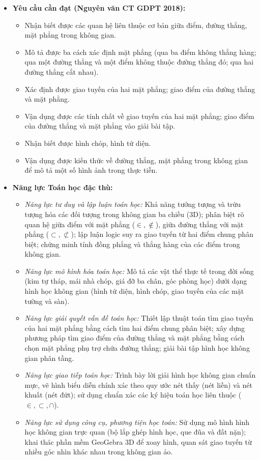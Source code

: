 \documentclass[12pt, a4paper]{article}
\begin{document}
\begin{itemize}[leftmargin=1.2cm]
    \item \textbf{Yêu cầu cần đạt (Nguyên văn CT GDPT 2018):}
    \begin{itemize}[leftmargin=0.6cm]
        \item Nhận biết được các quan hệ liên thuộc cơ bản giữa điểm, đường thẳng, mặt phẳng trong không gian.
        \item Mô tả được ba cách xác định mặt phẳng (qua ba điểm không thẳng hàng; qua một đường thẳng và một điểm không thuộc đường thẳng đó; qua hai đường thẳng cắt nhau).
        \item Xác định được giao tuyến của hai mặt phẳng; giao điểm của đường thẳng và mặt phẳng.
        \item Vận dụng được các tính chất về giao tuyến của hai mặt phẳng; giao điểm của đường thẳng và mặt phẳng vào giải bài tập.
        \item Nhận biết được hình chóp, hình tứ diện.
        \item Vận dụng được kiến thức về đường thẳng, mặt phẳng trong không gian để mô tả một số hình ảnh trong thực tiễn.
    \end{itemize}

    \item \textbf{Năng lực Toán học đặc thù:}
    \begin{itemize}[leftmargin=0.6cm]
        \item \textit{Năng lực tư duy và lập luận toán học:} Khả năng tưởng tượng và trừu tượng hóa các đối tượng trong không gian ba chiều ($3\text{D}$); phân biệt rõ quan hệ giữa điểm với mặt phẳng ($\in, \notin$), giữa đường thẳng với mặt phẳng ($\subset, \not\subset$); lập luận logic suy ra giao tuyến từ hai điểm chung phân biệt; chứng minh tính đồng phẳng và thẳng hàng của các điểm trong không gian.
        \item \textit{Năng lực mô hình hóa toán học:} Mô tả các vật thể thực tế trong đời sống (kim tự tháp, mái nhà chóp, giá đỡ ba chân, góc phòng học) dưới dạng hình học không gian (hình tứ diện, hình chóp, giao tuyến của các mặt tường và sàn).
        \item \textit{Năng lực giải quyết vấn đề toán học:} Thiết lập thuật toán tìm giao tuyến của hai mặt phẳng bằng cách tìm hai điểm chung phân biệt; xây dựng phương pháp tìm giao điểm của đường thẳng và mặt phẳng bằng cách chọn mặt phẳng phụ trợ chứa đường thẳng; giải bài tập hình học không gian phân tầng.
        \item \textit{Năng lực giao tiếp toán học:} Trình bày lời giải hình học không gian chuẩn mực, vẽ hình biểu diễn chính xác theo quy ước nét thấy (nét liền) và nét khuất (nét đứt); sử dụng chuẩn xác các ký hiệu toán học liên thuộc ($\in, \subset, \cap$).
        \item \textit{Năng lực sử dụng công cụ, phương tiện học toán:} Sử dụng mô hình hình học không gian trực quan (bộ lắp ghép hình học, que đũa và đất nặn); khai thác phần mềm GeoGebra 3D để xoay hình, quan sát giao tuyến từ nhiều góc nhìn khác nhau trong không gian ảo.
    \end{itemize}


\end{itemize}
\end{document}
